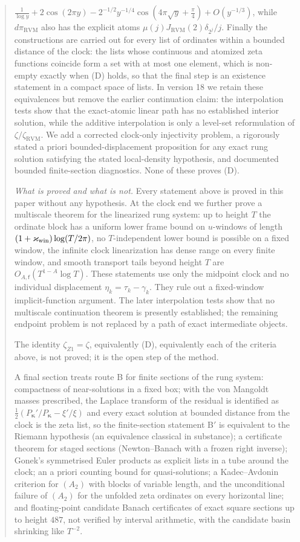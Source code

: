 \documentclass[11pt,reqno]{amsart}
\numberwithin{equation}{section}
\theoremstyle{plain}
\theoremstyle{definition}
\theoremstyle{remark}
\newcommand{\RVM}{\mathrm{RVM}}
\begin{document}
\begin{abstract}
$\frac1{\log y}+2\cos(2\pi y)-2^{-1/2}y^{-1/4}\cos(4\pi\sqrt y+\frac\pi4)+O(y^{-1/3})$, while $d\pi_{\RVM}$ also has the explicit atoms $\mu(j)J_{\RVM}(2)\delta_{2^j}/j$.  Finally the constructions are carried out for every list of ordinates within a bounded distance of the clock: the lists whose continuous and atomized zeta functions coincide form a set with at most one element, which is non-empty exactly when (D) holds, so that the final step is an existence statement in a compact space of lists.  In version 18 we retain these equivalences but remove the earlier continuation claim: the interpolation tests show that the exact-atomic linear path has no established interior solution, while the additive interpolation is only a level-set reformulation of $\zeta/\zeta_{\RVM}$.  We add a corrected clock-only injectivity problem, a rigorously stated a priori bounded-displacement proposition for any exact rung solution satisfying the stated local-density hypothesis, and documented bounded finite-section diagnostics.  None of these proves (D).

\emph{What is proved and what is not.}  Every statement above is proved in this paper without any hypothesis.  At the clock end we further prove a multiscale theorem for the linearized rung system: up to height $T$ the ordinate block has a uniform lower frame bound on $u$-windows of length $(1+\varkappa_{\rm win})\log(T/2\pi)$, no $T$-independent lower bound is possible on a fixed window, the infinite clock linearization has dense range on every finite window, and smooth transport tails beyond height $T$ are $O_{A,\mathsf f}(T^{1-A}\log T)$.  These statements use only the midpoint clock and no individual displacement $\eta_k=\tau_k-\gamma_k$.  They rule out a fixed-window implicit-function argument.  The later interpolation tests show that no multiscale continuation theorem is presently established; the remaining endpoint problem is not replaced by a path of exact intermediate objects.

The identity $\zeta_{Z1}=\zeta$, equivalently (D), equivalently each of the criteria above, is not proved; it is the open step of the method.

A final section treats route B for finite sections of the rung system: compactness of near-solutions in a fixed box; with the von Mangoldt masses prescribed, the Laplace transform of the residual is identified as $\frac12(P_{\boldsymbol\kappa}'/P_{\boldsymbol\kappa}-\xi'/\xi)$ and every exact solution at bounded distance from the clock is the zeta list, so the finite-section statement B$'$ is equivalent to the Riemann hypothesis (an equivalence classical in substance); a certificate theorem for staged sections (Newton--Banach with a frozen right inverse); Gonek's symmetrised Euler products as explicit lists in a tube around the clock; an a priori counting bound for quasi-solutions; a Kadec--Avdonin criterion for $(A_2)$ with blocks of variable length, and the unconditional failure of $(A_2)$ for the unfolded zeta ordinates on every horizontal line; and floating-point candidate Banach certificates of exact square sections up to height $487$, not verified by interval arithmetic, with the candidate basin shrinking like $T^{-2}$.
\end{abstract}
\end{document}
